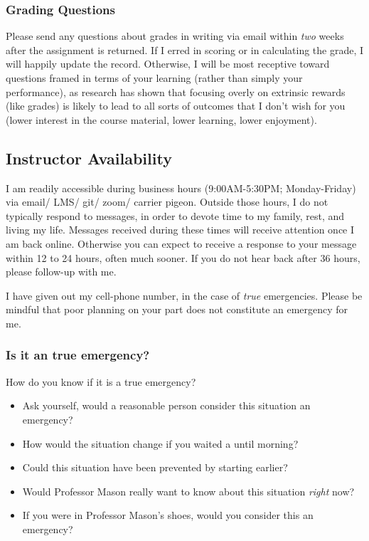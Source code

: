 \documentclass[11pt,]{article}
\providecommand{\tightlist}{%
  \setlength{\itemsep}{0pt}\setlength{\parskip}{0pt}}
\begin{document}
\hypertarget{grading-questions}{%
\subsubsection{Grading Questions}\label{grading-questions}}

Please send any questions about grades in writing via email within
\emph{two} weeks after the assignment is returned. If I erred in scoring
or in calculating the grade, I will happily update the record.
Otherwise, I will be most receptive toward questions framed in terms of
your learning (rather than simply your performance), as research has
shown that focusing overly on extrinsic rewards (like grades) is likely
to lead to all sorts of outcomes that I don't wish for you (lower
interest in the course material, lower learning, lower enjoyment).

\hypertarget{instructor-availability}{%
\subsection{Instructor Availability}\label{instructor-availability}}

I am readily accessible during business hours (9:00AM-5:30PM;
Monday-Friday) via email/ LMS/ git/ zoom/ carrier pigeon. Outside those
hours, I do not typically respond to messages, in order to devote time
to my family, rest, and living my life. Messages received during these
times will receive attention once I am back online. Otherwise you can
expect to receive a response to your message within 12 to 24 hours,
often much sooner. If you do not hear back after 36 hours, please
follow-up with me.

I have given out my cell-phone number, in the case of \emph{true}
emergencies. Please be mindful that poor planning on your part does not
constitute an emergency for me.

\hypertarget{is-it-an-true-emergency}{%
\subsubsection{Is it an true emergency?}\label{is-it-an-true-emergency}}

How do you know if it is a true emergency?

\begin{itemize}
\tightlist
\item
  Ask yourself, would a reasonable person consider this situation an
  emergency?
\item
  How would the situation change if you waited a until morning?
\item
  Could this situation have been prevented by starting earlier?
\item
  Would Professor Mason really want to know about this situation
  \emph{right} now?
\item
  If you were in Professor Mason's shoes, would you consider this an
  emergency?
\end{itemize}
\end{document}
